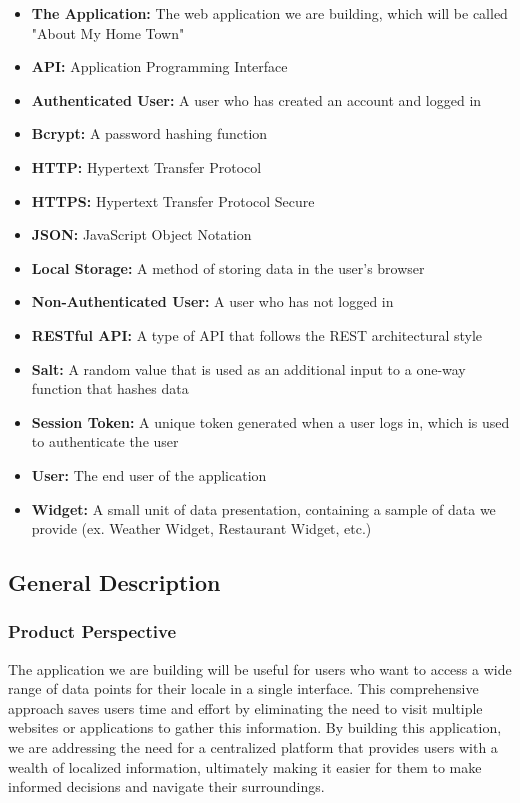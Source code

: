 \documentclass[12pt]{article}
\begin{document}
\begin{itemize}
    \item \textbf{The Application:} The web application we are building, which will be called "About My Home Town"
    \item \textbf{API:} Application Programming Interface
    \item \textbf{Authenticated User:} A user who has created an account and logged in
    \item \textbf{Bcrypt:} A password hashing function
    \item \textbf{HTTP:} Hypertext Transfer Protocol
    \item \textbf{HTTPS:} Hypertext Transfer Protocol Secure
    \item \textbf{JSON:} JavaScript Object Notation
    \item \textbf{Local Storage:} A method of storing data in the user's browser
    \item \textbf{Non-Authenticated User:} A user who has not logged in
    \item \textbf{RESTful API:} A type of API that follows the REST architectural style
    \item \textbf{Salt:} A random value that is used as an additional input to a one-way function that hashes data
    \item \textbf{Session Token:} A unique token generated when a user logs in, which is used to authenticate the user
    \item \textbf{User:} The end user of the application
    \item \textbf{Widget:} A small unit of data presentation, containing a sample of data we provide (ex. Weather Widget, Restaurant Widget, etc.)
\end{itemize}

\subsection{General Description}

\subsubsection{Product Perspective}

The application we are building will be useful for users who want to access a wide range of data points for their locale in a single interface. This comprehensive approach saves users time and effort by eliminating the need to visit multiple websites or applications to gather this information. By building this application, we are addressing the need for a centralized platform that provides users with a wealth of localized information, ultimately making it easier for them to make informed decisions and navigate their surroundings.
\end{document}
